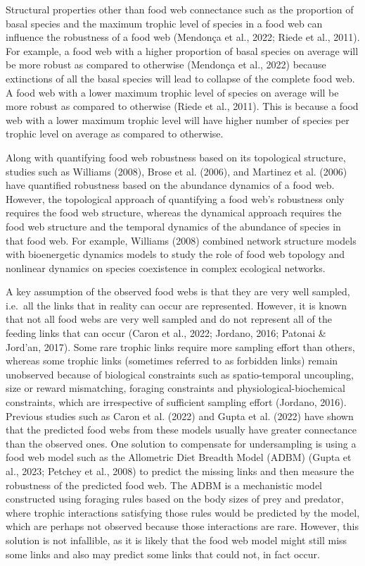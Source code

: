 \documentclass{article}
\begin{document}
Structural properties other than food web connectance such as the
proportion of basal species and the maximum trophic level of species in
a food web can influence the robustness of a food web (Mendonça et al.,
2022; Riede et al., 2011). For example, a food web with a higher
proportion of basal species on average will be more robust as compared
to otherwise (Mendonça et al., 2022) because extinctions of all the
basal species will lead to collapse of the complete food web. A food web
with a lower maximum trophic level of species on average will be more
robust as compared to otherwise (Riede et al., 2011). This is because a
food web with a lower maximum trophic level will have higher number of
species per trophic level on average as compared to otherwise.

Along with quantifying food web robustness based on its topological
structure, studies such as Williams (2008), Brose et al. (2006), and
Martinez et al. (2006) have quantified robustness based on the abundance
dynamics of a food web. However, the topological approach of quantifying
a food web's robustness only requires the food web structure, whereas
the dynamical approach requires the food web structure and the temporal
dynamics of the abundance of species in that food web. For example,
Williams (2008) combined network structure models with bioenergetic
dynamics models to study the role of food web topology and nonlinear
dynamics on species coexistence in complex ecological networks.

A key assumption of the observed food webs is that they are very well
sampled, i.e.~all the links that in reality can occur are represented.
However, it is known that not all food webs are very well sampled and do
not represent all of the feeding links that can occur (Caron et al.,
2022; Jordano, 2016; Patonai \& Jord'an, 2017). Some rare trophic links
require more sampling effort than others, whereas some trophic links
(sometimes referred to as forbidden links) remain unobserved because of
biological constraints such as spatio-temporal uncoupling, size or
reward mismatching, foraging constraints and physiological-biochemical
constraints, which are irrespective of sufficient sampling effort
(Jordano, 2016). Previous studies such as Caron et al. (2022) and Gupta
et al. (2022) have shown that the predicted food webs from these models
usually have greater connectance than the observed ones. One solution to
compensate for undersampling is using a food web model such as the
Allometric Diet Breadth Model (ADBM) (Gupta et al., 2023; Petchey et
al., 2008) to predict the missing links and then measure the robustness
of the predicted food web. The ADBM is a mechanistic model constructed
using foraging rules based on the body sizes of prey and predator, where
trophic interactions satisfying those rules would be predicted by the
model, which are perhaps not observed because those interactions are
rare. However, this solution is not infallible, as it is likely that the
food web model might still miss some links and also may predict some
links that could not, in fact occur.
\end{document}

